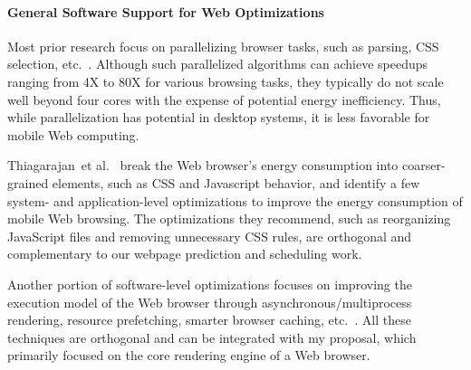 \paragraph{General Software Support for Web Optimizations} Most prior research focus on parallelizing browser tasks, such as parsing, CSS selection, etc.~\cite{ParallelBrowser,FTL,UCI,Parabix}. Although such parallelized algorithms can achieve speedups ranging from 4X to 80X for various browsing tasks, they typically do not scale well beyond four cores with the expense of potential energy inefficiency. Thus, while parallelization has potential in desktop systems, it is less favorable for mobile Web computing.

Thiagarajan~et al.~\cite{www-battery} break the Web browser's energy consumption into coarser-grained elements, such as CSS and Javascript behavior, and identify a few system- and application-level optimizations to improve the energy consumption of mobile Web browsing.  The optimizations they recommend, such as reorganizing JavaScript files and removing unnecessary CSS rules, are orthogonal and complementary to our webpage prediction and scheduling work.

Another portion of software-level optimizations focuses on improving the execution model of the Web browser through asynchronous/multiprocess rendering, resource prefetching, smarter browser caching, etc.~\cite{pocketweb,Adrenaline,smart-caching,webkit2,firefox-spec_parsing}. All these techniques are orthogonal and can be integrated with my proposal, which primarily focused on the core rendering engine of a Web browser.

